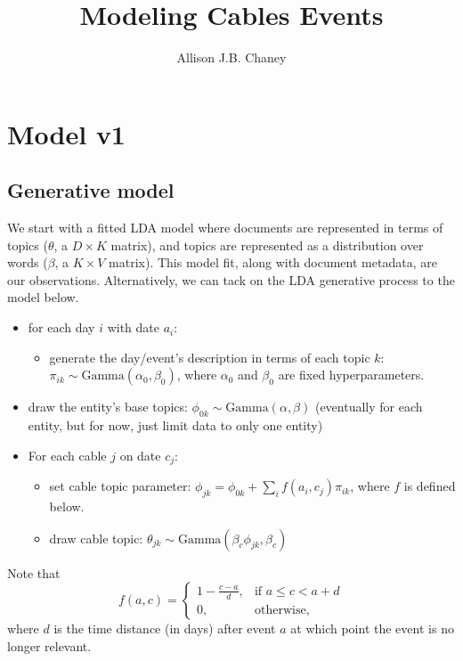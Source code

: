 \documentclass{article}
\begin{document}
\title{Modeling Cables Events}

\author{Allison J.B. Chaney}

\maketitle

\section{Model v1}
\subsection{Generative model}
We start with a fitted LDA model where documents are represented in terms of topics ($\theta$, a $D \times K$ matrix), and topics are represented as a distribution over words ($\beta$, a $K \times V$ matrix).  This model fit, along with document metadata, are our observations.  Alternatively, we can tack on the LDA generative process to the model below.

\begin{itemize}
\item for each day $i$ with date $a_i$:
\begin{itemize}
\item generate the day/event's description in terms of each topic $k$: $\pi_{ik} \sim \mbox{Gamma}(\alpha_0, \beta_0)$, where $\alpha_0$ and $\beta_0$ are fixed hyperparameters.
\end{itemize}
\item draw the entity's base topics: $\phi_{0k} \sim \mbox{Gamma}(\alpha, \beta)$ (eventually for each entity, but for now, just limit data to only one entity)
\item For each cable $j$ on date $c_j$:
\begin{itemize}
	\item set cable topic parameter: $\phi_{jk} = \phi_{0k} + \sum_i f(a_i, c_j) \pi_{ik}$, where $f$ is defined below.
	\item draw cable topic: $\theta_{jk} \sim \mbox{Gamma}(\beta_c \phi_{jk}, \beta_c)$
\end{itemize}
\end{itemize}

\noindent Note that\[f(a, c) =
\begin{cases}
	1 - \frac{c-a}{d}, & \mbox{if } a \le c < a+d \\
	0, & \mbox{otherwise,}
\end{cases} \]
where $d$ is the time distance (in days) after event $a$ at which point the event is no longer relevant.
\end{document}
